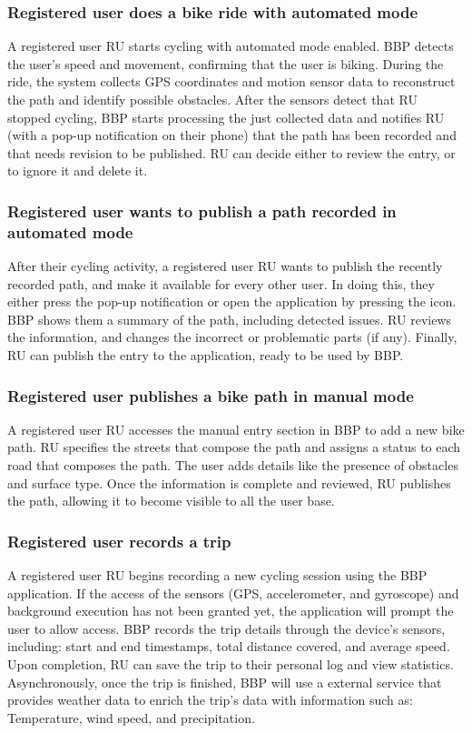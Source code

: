 \subsubsection*{Registered user does a bike ride with automated mode}
A registered user RU starts cycling with automated mode enabled. BBP detects the user’s speed and movement, confirming that the user is biking. During the ride, the system collects GPS coordinates and motion sensor data to reconstruct the path and identify possible obstacles. After the sensors detect that RU stopped cycling, BBP starts processing the just collected data and notifies RU (with a pop-up notification on their phone) that the path has been recorded and that needs revision to be published. RU can decide either to review the entry, or to ignore it and delete it.


\subsubsection*{Registered user wants to publish a path recorded in automated mode}
After their cycling activity, a registered user RU wants to publish the recently recorded path, and make it available for every other user. In doing this, they either press the pop-up notification or open the application by pressing the icon. BBP shows them a summary of the path, including detected issues. RU reviews the information, and changes the incorrect or problematic parts (if any). Finally, RU can publish the entry to the application, ready to be used by BBP.

\subsubsection*{Registered user publishes a bike path in manual mode}

A registered user RU accesses the manual entry section in BBP to add a new bike path. RU specifies the streets that compose the path and assigns a status to each road that composes the path. The user adds details like the presence of obstacles and surface type. Once the information is complete and reviewed, RU publishes the path, allowing it to become visible to all the user base.

\subsubsection*{Registered user records a trip}
A registered user RU begins recording a new cycling session using the BBP application. If the access of the sensors (GPS, accelerometer, and gyroscope) and background execution has not been granted yet, the application will prompt the user to allow access. BBP records the trip details through the device's sensors, including: start and end timestamps, total distance covered, and average speed. Upon completion, RU can save the trip to their personal log and view statistics. 
Asynchronously, once the trip is finished, BBP will use a external service that provides weather data to enrich the trip's data with information such as: Temperature, wind speed, and precipitation.

